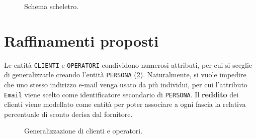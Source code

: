 \documentclass[a4paper,12pt]{report}
\begin{document}
\begin{figure}[H]
\centering{}
\caption{Schema scheletro.}
\label{fig:barebones}
\end{figure}

\section{Raffinamenti proposti}
Le entità \texttt{CLIENTI} e \texttt{OPERATORI} condividono numerosi attributi, per cui si sceglie di generalizzarle creando l'entità \texttt{PERSONA} (\cref{fig:persons}). Naturalmente, si vuole impedire che uno stesso indirizzo e-mail venga usato da più individui, per cui l'attributo \texttt{Email} viene scelto come identificatore secondario di \texttt{PERSONA}.
\newline
Il \textbf{reddito} dei clienti viene modellato come entità per poter associare a ogni fascia la relativa percentuale di sconto decisa dal fornitore.

\begin{figure}[H]
\centering{}
\caption{Generalizzazione di clienti e operatori.}
\label{fig:persons}
\end{figure}
\end{document}
